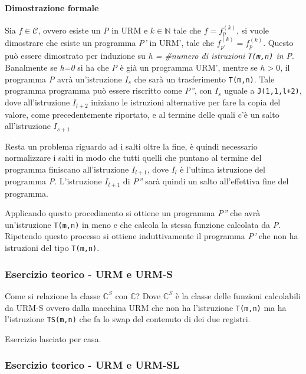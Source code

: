 \paragraph{Dimostrazione formale} Sia $f \in \mathcal{C}$, ovvero esiste un \emph{P} in URM e $k \in \mathbb{N}$ tale che $f = f_{p}^{(k)}$, si vuole dimostrare che esiste un programma \emph{P'} in URM', tale che $f_{p'}^{(k)} = f_{p}^{(k)}$.
Questo può essere dimostrato per induzione su \emph{h = \#numero di
istruzioni \texttt{T(m,n)} in P}.
Banalmente se \emph{h=0} si ha che \emph{P} è già un programma URM', mentre se $h > 0$, il programma \emph{P} avrà un'istruzione $I_s$ che sarà un trasferimento \texttt{T(m,n)}. 
Tale programma programma può essere riscritto come \emph{P''}, con $I_s$ uguale a \texttt{J(1,1,l+2)}, dove all'istruzione $I_{l+2}$ iniziano le istruzioni alternative per fare la copia del valore, come precedentemente riportato, e al termine delle quali c'è un salto all'istruzione $I_{s+1}$

Resta un problema riguardo ad i salti oltre la fine, è quindi necessario normalizzare i salti in modo che tutti quelli che puntano al termine del programma finiscano all'istruzione $I_{l+1}$, dove $I_l$ è l'ultima istruzione del programma \emph{P}. L'istruzione $I_{l+1}$ di \emph{P''} sarà quindi un salto all'effettiva fine del programma.

Applicando questo procedimento si ottiene un programma \emph{P''} che avrà un'istruzione \texttt{T(m,n)} in meno e che calcola la stessa funzione calcolata da \emph{P}.
Ripetendo questo processo si ottiene induttivamente il programma \emph{P'} che non ha istruzioni del tipo \texttt{T(m,n)}.

\subsubsection{Esercizio teorico - URM e URM-S}\label{esercizio-teorico---urm-e-urm-s}

Come si relazione la classe $\mathbb{C}^S$ con $\mathbb{C}$? Dove $\mathbb{C}^S$ è la classe delle funzioni calcolabili da URM-S ovvero dalla macchina URM che non ha l'istruzione \texttt{T(m,n)} ma ha l'istruzione \texttt{TS(m,n)} che fa lo swap del contenuto di dei due registri.

Esercizio lasciato per casa.


\subsubsection{Esercizio teorico - URM e URM-SL}\label{esercizione-teorico---urm-e-urm-sl}

